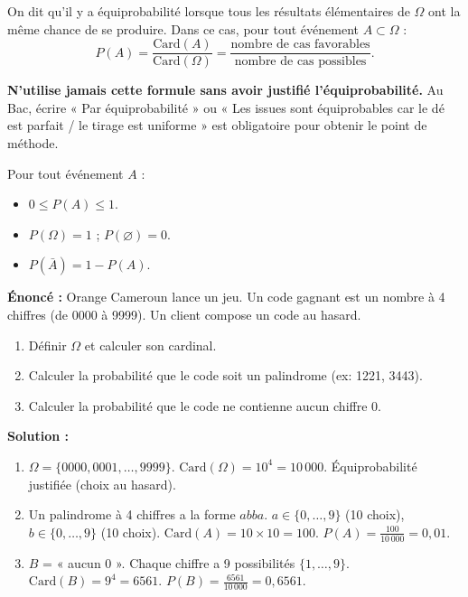 \documentclass[11pt]{article}
\newcommand{\cle}[1]{{\popxbold\color{popdark}#1}}
\begin{document}
\begin{definition}[Équiprobabilité]
On dit qu'il y a \cle{équiprobabilité} lorsque tous les résultats élémentaires de $\Omega$ ont la même chance de se produire. Dans ce cas, pour tout événement $A \subset \Omega$ :
\[
P(A) = \frac{\mathrm{Card}(A)}{\mathrm{Card}(\Omega)} = \frac{\text{nombre de cas favorables}}{\text{nombre de cas possibles}}.
\]
\end{definition}

\begin{attention}
\textbf{N'utilise jamais cette formule sans avoir justifié l'équiprobabilité.} Au Bac, écrire « Par équiprobabilité » ou « Les issues sont équiprobables car le dé est parfait / le tirage est uniforme » est obligatoire pour obtenir le point de méthode.
\end{attention}

\begin{propriete}
Pour tout événement $A$ :
\begin{itemize}
    \item $0 \le P(A) \le 1$.
    \item $P(\Omega) = 1$ ; $P(\varnothing) = 0$.
    \item $P(\bar{A}) = 1 - P(A)$.
\end{itemize}
\end{propriete}

\begin{exoresolu}
\textbf{Énoncé :} Orange Cameroun lance un jeu. Un code gagnant est un nombre à 4 chiffres (de 0000 à 9999). Un client compose un code au hasard.
\begin{enumerate}
    \item Définir $\Omega$ et calculer son cardinal.
    \item Calculer la probabilité que le code soit un palindrome (ex: 1221, 3443).
    \item Calculer la probabilité que le code ne contienne aucun chiffre 0.
\end{enumerate}
\textbf{Solution :}
\begin{enumerate}
    \item $\Omega = \{0000, 0001, \dots, 9999\}$. $\mathrm{Card}(\Omega) = 10^4 = 10\,000$. Équiprobabilité justifiée (choix au hasard).
    \item Un palindrome à 4 chiffres a la forme $abba$. $a \in \{0,\dots,9\}$ (10 choix), $b \in \{0,\dots,9\}$ (10 choix). $\mathrm{Card}(A) = 10 \times 10 = 100$. $P(A) = \frac{100}{10\,000} = 0,01$.
    \item $B$ = « aucun 0 ». Chaque chiffre a 9 possibilités $\{1,\dots,9\}$. $\mathrm{Card}(B) = 9^4 = 6561$. $P(B) = \frac{6561}{10\,000} = 0,6561$.
\end{enumerate}
\end{exoresolu}
\end{document}
